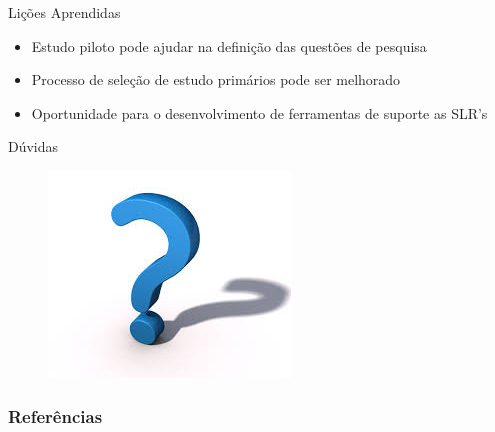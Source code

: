 \documentclass[t,14pt,mathserif]{beamer}
\begin{document}
\begin{frame}{Lições Aprendidas}
    \begin{itemize}
      \item Estudo piloto pode ajudar na definição das questões de pesquisa
      \item Processo de seleção de estudo primários pode ser melhorado
      \item Oportunidade para o desenvolvimento de ferramentas de suporte as SLR's
    \end{itemize}
\end{frame}
\begin{frame}{Dúvidas}

\begin{figure}[htb]
\centering
\includegraphics[width=.5\textwidth]{../img/questions.jpg}
\end{figure}
\end{frame}

\begin{frame}[allowframebreaks]
   \frametitle{Referências}
   
   
\end{frame}
\end{document}
